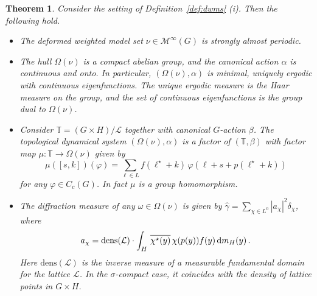 \documentclass[11pt, a4wide]{amsart}
\newcommand{\TT}{\mathbb{T}}
\newcommand{\cM}{\mathcal{M}}
\newcommand{\cL}{\mathcal L}
\newtheorem{theorem}[lemma]{Theorem}
\numberwithin{lemma}{section}
\begin{document}
\begin{theorem} \label{nu-stronglyAlmostPeriodic}
Consider the setting of Definition~\ref{def:dwms} (i). Then the following hold.
%
\begin{itemize}
\item[(i)] The deformed weighted model set $\nu \in \cM^\infty(G)$ is strongly almost periodic.

\item[(ii)] The hull $\Omega(\nu)$ is a compact abelian group, and the canonical  action $\alpha$ is  continuous and onto. In particular,  $(\Omega(\nu), \alpha)$ is minimal, uniquely ergodic with continuous eigenfunctions. The unique ergodic measure is the Haar measure on the group, and the set of continuous eigenfunctions is the group dual to $\Omega(\nu)$.
 \item[(iii)] Consider $\TT=(G\times H)/\cL$ together with canonical $G$-action $\beta$. The topological dynamical system $(\varOmega (\nu),\alpha)$ is a factor of $(\TT,\beta)$ with factor map $ \mu : \TT \to \varOmega(\nu)$ given by
%
\begin{displaymath}
\mu ([s,k]) (\varphi) =\sum_{\ell\in L} f(\ell^\star+k) \,\varphi (\ell+s + p(\ell^\star+k))
\end{displaymath}
%
for any $\varphi\in C_c(G)$. In fact $\mu $ is a group homomorphism.



\item[(iv)] The diffraction measure of any $\omega\in \Omega(\nu)$ is given by $\widehat\gamma=\sum_{\chi \in L^0} |a_\chi|^2\delta_\chi$, where
%
\begin{displaymath}
a_\chi= \mathrm{dens}(\cL) \cdot \int_H \, \overline{\chi^\star(y)} \,\chi(p(y)) f(y) \, {\rm d}m_H(y) \,.
\end{displaymath}
%
Here $\mathrm{dens}(\cL)$ is the inverse measure of a measurable fundamental domain for the lattice $\cL$. In the $\sigma$-compact case, it coincides with the density of lattice points in $G\times H$.
\end{itemize}
\end{theorem}
\end{document}
